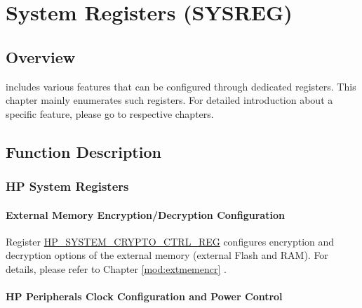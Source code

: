 \documentclass[main\_\_EN.tex]{subfiles}
\begin{document}

\ifglobal
\else
    {\let\clearpage\relax \listoftodos}
    \tableofcontents
\fi











\chapter{System Registers (SYSREG)}
\label{mod:sysreg}
\hypertarget{sysreg}{}

\section{Overview}

\chipname{} includes various features that can be configured through dedicated registers. This chapter mainly enumerates such registers. For detailed introduction about a specific feature, please go to respective chapters.

\section{Function Description}

\subsection{HP System Registers}

\subsubsection{External Memory Encryption/Decryption Configuration}

Register \hyperref[regdesc:HPSYSTEMCRYPTOCTRLREG]{HP\_SYSTEM\_CRYPTO\_CTRL\_REG} configures encryption and decryption options of the external memory (external Flash and RAM). For details, please refer to Chapter \ref{mod:extmemencr} \textit{}.

\subsubsection{HP Peripherals Clock Configuration and Power Control}
\end{document}

